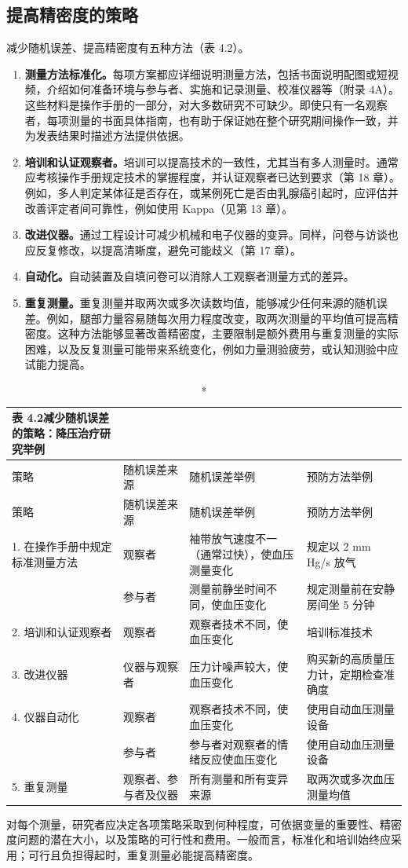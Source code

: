 \subsection{提高精密度的策略}
减少随机误差、提高精密度有五种方法（表 4.2）。
\begin{enumerate}
\item \textbf{测量方法标准化。}每项方案都应详细说明测量方法，包括书面说明配图或短视频，介绍如何准备环境与参与者、实施和记录测量、校准仪器等（附录 4A）。
这些材料是操作手册的一部分，对大多数研究不可缺少。即使只有一名观察者，每项测量的书面具体指南，也有助于保证她在整个研究期间操作一致，并为发表结果时描述方法提供依据。
\item \textbf{培训和认证观察者。}培训可以提高技术的一致性，尤其当有多人测量时。通常应考核操作手册规定技术的掌握程度，并认证观察者已达到要求（第 18 章）。例如，多人判定某体征是否存在，或某例死亡是否由乳腺癌引起时，应评估并改善评定者间可靠性，例如使用 Kappa（见第 13 章）。
\item \textbf{改进仪器。}通过工程设计可减少机械和电子仪器的变异。同样，问卷与访谈也应反复修改，以提高清晰度，避免可能歧义（第 17 章）。
\item \textbf{自动化。}自动装置及自填问卷可以消除人工观察者测量方式的差异。
\item \textbf{重复测量。}重复测量并取两次或多次读数均值，能够减少任何来源的随机误差。例如，腿部力量容易随每次用力程度改变，取两次测量的平均值可提高精密度。这种方法能够显著改善精密度，主要限制是额外费用与重复测量的实际困难，以及反复测量可能带来系统变化，例如力量测验疲劳，或认知测验中应试能力提高。
\end{enumerate}
{\small\setlength{\tabcolsep}{3pt}
\begin{longtable}{L{33mm}L{23mm}L{48mm}L{43mm}}
\caption*{\textbf{表 4.2}\quad 减少随机误差的策略：降压治疗研究举例}\\
\toprule 策略 & 随机误差来源 & 随机误差举例 & 预防方法举例\\\midrule\endfirsthead
\toprule 策略 & 随机误差来源 & 随机误差举例 & 预防方法举例\\\midrule\endhead
{}1. 在操作手册中规定标准测量方法 & 观察者 & 袖带放气速度不一（通常过快），使血压测量变化 & 规定以 2 mm Hg/s 放气\\
 & 参与者 & 测量前静坐时间不同，使血压变化 & 规定测量前在安静房间坐 5 分钟\\
2. 培训和认证观察者 & 观察者 & 观察者技术不同，使血压变化 & 培训标准技术\\
3. 改进仪器 & 仪器与观察者 & 压力计噪声较大，使血压变化 & 购买新的高质量压力计，定期检查准确度\\
4. 仪器自动化 & 观察者 & 观察者技术不同，使血压变化 & 使用自动血压测量设备\\
 & 参与者 & 参与者对观察者的情绪反应使血压变化 & 使用自动血压测量设备\\
5. 重复测量 & 观察者、参与者及仪器 & 所有测量和所有变异来源 & 取两次或多次血压测量均值\\\bottomrule
\end{longtable}}
对每个测量，研究者应决定各项策略采取到何种程度，可依据变量的重要性、精密度问题的潜在大小，以及策略的可行性和费用。一般而言，标准化和培训始终应采用；可行且负担得起时，重复测量必能提高精密度。

